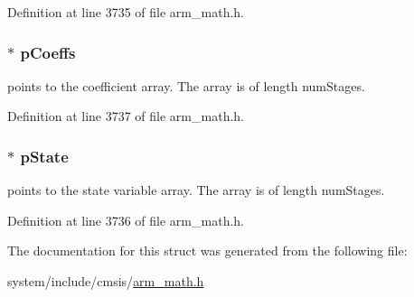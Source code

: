 Definition at line 3735 of file arm\+\_\+math.\+h.

\subsubsection[{\texorpdfstring{p\+Coeffs}{pCoeffs}}]{$\ast$ p\+Coeffs}\hypertarget{structarm__fir__lattice__instance__q31_a68888e36167d81cb7836db10367a1682}{}\label{structarm__fir__lattice__instance__q31_a68888e36167d81cb7836db10367a1682}
points to the coefficient array. The array is of length num\+Stages. 

Definition at line 3737 of file arm\+\_\+math.\+h.

\subsubsection[{\texorpdfstring{p\+State}{pState}}]{$\ast$ p\+State}\hypertarget{structarm__fir__lattice__instance__q31_adee4ba3ee8869865af7d8fa08ca913d6}{}\label{structarm__fir__lattice__instance__q31_adee4ba3ee8869865af7d8fa08ca913d6}
points to the state variable array. The array is of length num\+Stages. 

Definition at line 3736 of file arm\+\_\+math.\+h.



The documentation for this struct was generated from the following file\+:\begin{DoxyCompactItemize}
\item 
system/include/cmsis/\hyperlink{arm__math_8h}{arm\+\_\+math.\+h}\end{DoxyCompactItemize}
